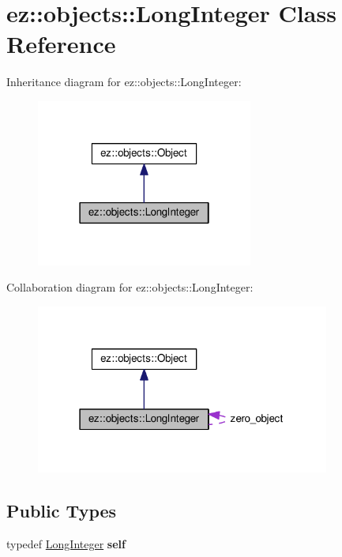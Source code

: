 \hypertarget{classez_1_1objects_1_1LongInteger}{}\section{ez\+:\+:objects\+:\+:Long\+Integer Class Reference}
\label{classez_1_1objects_1_1LongInteger}


Inheritance diagram for ez\+:\+:objects\+:\+:Long\+Integer\+:
\nopagebreak
\begin{figure}[H]
\begin{center}
\leavevmode
\includegraphics[width=202pt]{classez_1_1objects_1_1LongInteger__inherit__graph}
\end{center}
\end{figure}


Collaboration diagram for ez\+:\+:objects\+:\+:Long\+Integer\+:
\nopagebreak
\begin{figure}[H]
\begin{center}
\leavevmode
\includegraphics[width=274pt]{classez_1_1objects_1_1LongInteger__coll__graph}
\end{center}
\end{figure}
\subsection*{Public Types}
\begin{DoxyCompactItemize}
\item 
\mbox{\label{classez_1_1objects_1_1LongInteger_a8f4d456ffd2dd99602d406bee72619d0}} 
typedef \hyperlink{classez_1_1objects_1_1LongInteger}{Long\+Integer} {\bfseries self}
\end{DoxyCompactItemize}
